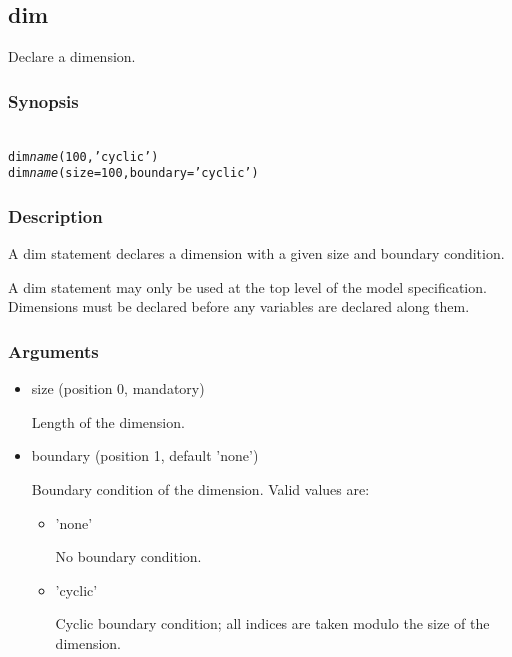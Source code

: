 \subsection{{\sf dim}\label{dim}}

Declare a dimension.

\subsubsection*{Synopsis\label{dim_Synopsis}}
\begin{alltt}{\sf
    dim \textsl{name}(100, 'cyclic')
    dim \textsl{name}(size = 100, boundary = 'cyclic')
}\end{alltt}


\subsubsection*{Description\label{dim_Description}}

A \textsf{dim} statement declares a dimension with a given size and boundary
condition.

A \textsf{dim} statement may only be used at the top level of the model
specification. Dimensions must be declared before any variables are declared
along them.

\subsubsection*{Arguments\label{dim_Arguments}}

\begin{itemize}
\item \textsf{size} (position 0, mandatory)

Length of the dimension.

\item \textsf{boundary} (position 1, default 'none')

Boundary condition of the dimension. Valid values are:

\begin{itemize}

\item \textsf{'none'}

No boundary condition.

\item \textsf{'cyclic'}

Cyclic boundary condition; all indices are taken modulo the \textsf{size} of
the dimension.

\end{itemize}
\end{itemize}

